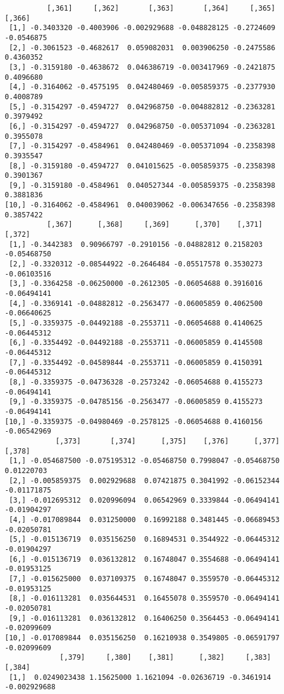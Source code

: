 \documentclass[
  letterpaper,
  DIV=11,
  numbers=noendperiod]{scrreprt}
\begin{document}
\begin{verbatim}
          [,361]     [,362]       [,363]       [,364]     [,365]     [,366]
 [1,] -0.3403320 -0.4003906 -0.002929688 -0.048828125 -0.2724609 -0.0546875
 [2,] -0.3061523 -0.4682617  0.059082031  0.003906250 -0.2475586  0.4360352
 [3,] -0.3159180 -0.4638672  0.046386719 -0.003417969 -0.2421875  0.4096680
 [4,] -0.3164062 -0.4575195  0.042480469 -0.005859375 -0.2377930  0.4008789
 [5,] -0.3154297 -0.4594727  0.042968750 -0.004882812 -0.2363281  0.3979492
 [6,] -0.3154297 -0.4594727  0.042968750 -0.005371094 -0.2363281  0.3955078
 [7,] -0.3154297 -0.4584961  0.042480469 -0.005371094 -0.2358398  0.3935547
 [8,] -0.3159180 -0.4594727  0.041015625 -0.005859375 -0.2358398  0.3901367
 [9,] -0.3159180 -0.4584961  0.040527344 -0.005859375 -0.2358398  0.3881836
[10,] -0.3164062 -0.4584961  0.040039062 -0.006347656 -0.2358398  0.3857422
          [,367]      [,368]     [,369]      [,370]    [,371]      [,372]
 [1,] -0.3442383  0.90966797 -0.2910156 -0.04882812 0.2158203 -0.05468750
 [2,] -0.3320312 -0.08544922 -0.2646484 -0.05517578 0.3530273 -0.06103516
 [3,] -0.3364258 -0.06250000 -0.2612305 -0.06054688 0.3916016 -0.06494141
 [4,] -0.3369141 -0.04882812 -0.2563477 -0.06005859 0.4062500 -0.06640625
 [5,] -0.3359375 -0.04492188 -0.2553711 -0.06054688 0.4140625 -0.06445312
 [6,] -0.3354492 -0.04492188 -0.2553711 -0.06005859 0.4145508 -0.06445312
 [7,] -0.3354492 -0.04589844 -0.2553711 -0.06005859 0.4150391 -0.06445312
 [8,] -0.3359375 -0.04736328 -0.2573242 -0.06054688 0.4155273 -0.06494141
 [9,] -0.3359375 -0.04785156 -0.2563477 -0.06005859 0.4155273 -0.06494141
[10,] -0.3359375 -0.04980469 -0.2578125 -0.06054688 0.4160156 -0.06542969
            [,373]       [,374]      [,375]    [,376]      [,377]      [,378]
 [1,] -0.054687500 -0.075195312 -0.05468750 0.7998047 -0.05468750  0.01220703
 [2,] -0.005859375  0.002929688  0.07421875 0.3041992 -0.06152344 -0.01171875
 [3,] -0.012695312  0.020996094  0.06542969 0.3339844 -0.06494141 -0.01904297
 [4,] -0.017089844  0.031250000  0.16992188 0.3481445 -0.06689453 -0.02050781
 [5,] -0.015136719  0.035156250  0.16894531 0.3544922 -0.06445312 -0.01904297
 [6,] -0.015136719  0.036132812  0.16748047 0.3554688 -0.06494141 -0.01953125
 [7,] -0.015625000  0.037109375  0.16748047 0.3559570 -0.06445312 -0.01953125
 [8,] -0.016113281  0.035644531  0.16455078 0.3559570 -0.06494141 -0.02050781
 [9,] -0.016113281  0.036132812  0.16406250 0.3564453 -0.06494141 -0.02099609
[10,] -0.017089844  0.035156250  0.16210938 0.3549805 -0.06591797 -0.02099609
             [,379]     [,380]    [,381]      [,382]     [,383]       [,384]
 [1,]  0.0249023438 1.15625000 1.1621094 -0.02636719 -0.3461914 -0.002929688

\end{verbatim}
\end{document}
